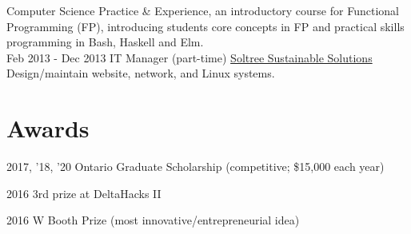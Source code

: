 \documentclass[letterpaper]{twentysecondcv} %
\begin{document}
\begin{twenty}
  {Computer Science Practice \& Experience, an introductory course for Functional Programming (FP), introducing students core concepts in FP and practical skills programming in Bash, Haskell and Elm.
}
	\\
	\twentyitem
	{Feb 2013 -}
	{Dec 2013}
	{IT Manager (part-time)}
	{\href{http://www.soltree.net/}{Soltree Sustainable Solutions}}
	{}
  {Design/maintain website, network, and Linux systems.}
\end{twenty}
\section{Awards}

\vspace{-.5em}
\begin{twenty}
  \twentyitem
  {2017, '18, '20}
  {}
  {Ontario Graduate Scholarship \textnormal{(competitive; \$15,000 each year)}}
	{}
	{}
	{}

	\twentyitem
	{2016}
	{}
	{3rd prize at DeltaHacks II}
	{}
	{}
	{}
	
	\twentyitem
	{2016}
	{}
	{W Booth Prize \textnormal{(most innovative/entrepreneurial idea)}}
	{}
	{}
	{}
\end{twenty}
\end{document}

